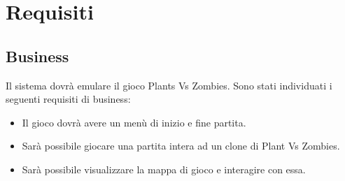 \newpage
\section{Requisiti}
\subsection{Business}
Il sistema dovrà emulare il gioco Plants Vs Zombies.
Sono stati individuati i seguenti requisiti di business:
\begin{itemize}
    \item Il gioco dovrà avere un menù di inizio e fine partita.
    \item Sarà possibile giocare una partita intera ad un clone di Plant Vs Zombies.
    \item Sarà possibile visualizzare la mappa di gioco e interagire con essa.
\end{itemize}


